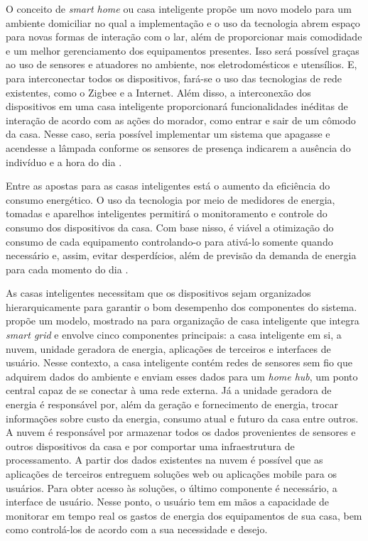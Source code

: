 O conceito de \textit{smart home} ou casa inteligente propõe um novo modelo para um ambiente domiciliar no qual a implementação e o uso da tecnologia abrem espaço para novas formas de interação com o lar, além de proporcionar mais comodidade e um melhor gerenciamento dos equipamentos presentes. Isso será possível graças ao uso de sensores e atuadores no ambiente, nos eletrodomésticos e utensílios. E, para interconectar todos os dispositivos, fará-se o uso das tecnologias de rede existentes, como o Zigbee e a Internet.
Além disso, a interconexão dos dispositivos em uma casa inteligente proporcionará funcionalidades inéditas de interação de acordo com as ações do morador, como entrar e sair de um cômodo da casa. Nesse caso, seria possível implementar um sistema que apagasse e acendesse a lâmpada conforme os sensores de presença indicarem a ausência do indivíduo e a hora do dia \cite{DeSilva2012}.

Entre as apostas para as casas inteligentes está o aumento da eficiência do consumo energético. O uso da tecnologia por meio de medidores de energia, tomadas e aparelhos inteligentes permitirá o monitoramento e controle do consumo dos dispositivos da casa. Com base nisso, é viável a otimização do consumo de cada equipamento controlando-o para ativá-lo somente quando necessário e, assim, evitar desperdícios, além de previsão da demanda de energia para cada momento do dia \cite{Stojkoska2017}.

As casas inteligentes necessitam que os dispositivos sejam organizados hierarquicamente para garantir o bom desempenho dos componentes do sistema.  propõe um modelo, mostrado na  para organização de casa inteligente que integra \textit{smart grid} e envolve cinco componentes principais: a casa inteligente em si, a nuvem, unidade geradora de energia, aplicações de terceiros e interfaces de usuário. Nesse contexto, a casa inteligente contém redes de sensores sem fio que adquirem dados do ambiente e enviam esses dados para um \textit{home hub}, um ponto central capaz de se conectar à uma rede externa. Já a unidade geradora de energia é responsável por, além da geração e fornecimento de energia, trocar informações sobre custo da energia, consumo atual e futuro da casa entre outros. A nuvem é responsável por armazenar todos os dados provenientes de sensores e outros dispositivos da casa e por comportar uma infraestrutura de processamento. A partir dos dados existentes na nuvem é possível que as aplicações de terceiros entreguem soluções web ou aplicações mobile para os usuários. Para obter acesso às soluções, o último componente é necessário, a interface de usuário. Nesse ponto, o usuário tem em mãos a capacidade de monitorar em tempo real os gastos de energia dos equipamentos de sua casa, bem como controlá-los de acordo com a sua necessidade e desejo.

